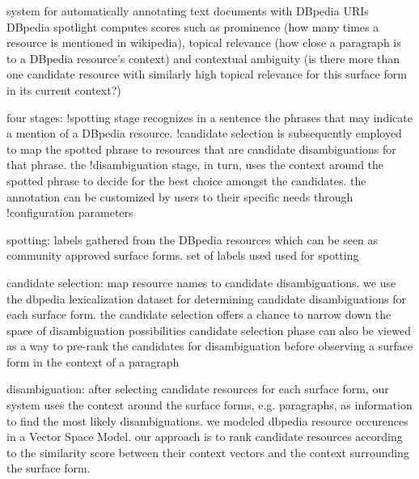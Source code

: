 system for automatically annotating text documents with DBpedia URIs
 DBpedia spotlight computes scores such as prominence (how many times a resource is mentioned in wikipedia), topical relevance (how close a paragraph is to a DBpedia resource's context) and contextual ambiguity (is there more than one candidate resource with similarly high topical relevance for this surface form in its current context?)

 four stages: !spotting stage recognizes in a sentence the phrases that may indicate a mention of a DBpedia resource. 
 !candidate selection is subsequently employed to map the spotted phrase to resources that are candidate disambiguations for that phrase.
 the !disambiguation stage, in turn, uses the context around the spotted phrase to decide for the best choice amongst the candidates. 
 the annotation can be customized by users to their specific needs through !configuration parameters

 spotting:
 labels gathered from the DBpedia resources which can be seen as community approved surface forms.
 set of labels used used for spotting

 candidate selection:
 map resource names to candidate disambiguations. we use the dbpedia lexicalization dataset for determining candidate disambiguations for each surface form.
 the candidate selection offers a chance to narrow down the space of disambiguation possibilities
 candidate selection phase can also be viewed as a way to pre-rank the candidates for disambiguation before observing a surface form in the context of a paragraph

 disambiguation:
 after selecting candidate resources for each surface form, our system uses the context around the surface forms, e.g. paragraphs, as information to find the most likely disambiguations.
 we modeled dbpedia resource occurences in a Vector Space Model.
 our approach is to rank candidate resources according to the similarity score between their context vectors and the context surrounding the surface form.
 \cite{mendes2011dbpedia}